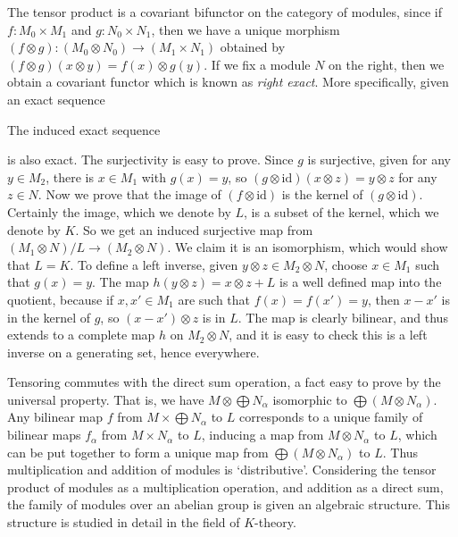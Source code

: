 The tensor product is a covariant bifunctor on the category of modules, since if $f: M_0 \times M_1$ and $g: N_0 \times N_1$, then we have a unique morphism $(f \otimes g): (M_0 \otimes N_0) \to (M_1 \times N_1)$ obtained by $(f \otimes g)(x \otimes y) = f(x) \otimes g(y)$. If we fix a module $N$ on the right, then we obtain a covariant functor which is known as \emph{right exact}. More specifically, given an exact sequence
%
\begin{center}
\end{center}
%
The induced exact sequence
%
\begin{center}
\end{center}
%
is also exact. The surjectivity is easy to prove. Since $g$ is surjective, given for any $y \in M_2$, there is $x \in M_1$ with $g(x) = y$, so $(g \otimes \text{id})(x \otimes z) = y \otimes z$ for any $z \in N$. Now we prove that the image of $(f \otimes \text{id})$ is the kernel of $(g \otimes \text{id})$. Certainly the image, which we denote by $L$, is a subset of the kernel, which we denote by $K$. So we get an induced surjective map from $(M_1 \otimes N)/L \to (M_2 \otimes N)$. We claim it is an isomorphism, which would show that $L = K$. To define a left inverse, given $y \otimes z \in M_2 \otimes N$, choose $x \in M_1$ such that $g(x) = y$. The map $h(y \otimes z) = x \otimes z + L$ is a well defined map into the quotient, because if $x,x' \in M_1$ are such that $f(x) = f(x') = y$, then $x - x'$ is in the kernel of $g$, so $(x - x') \otimes z$ is in $L$. The map is clearly bilinear, and thus extends to a complete map $h$ on $M_2 \otimes N$, and it is easy to check this is a left inverse on a generating set, hence everywhere.

Tensoring commutes with the direct sum operation, a fact easy to prove by the universal property. That is, we have $M \otimes \bigoplus N_\alpha$ isomorphic to $\bigoplus (M \otimes N_\alpha)$. Any bilinear map $f$ from $M \times \bigoplus N_\alpha$ to $L$ corresponds to a unique family of bilinear maps $f_\alpha$ from $M \times N_\alpha$ to $L$, inducing a map from $M \otimes N_\alpha$ to $L$, which can be put together to form a unique map from $\bigoplus (M \otimes N_\alpha)$ to $L$. Thus multiplication and addition of modules is `distributive'. Considering the tensor product of modules as a multiplication operation, and addition as a direct sum, the family of modules over an abelian group is given an algebraic structure. This structure is studied in detail in the field of $K$-theory.


